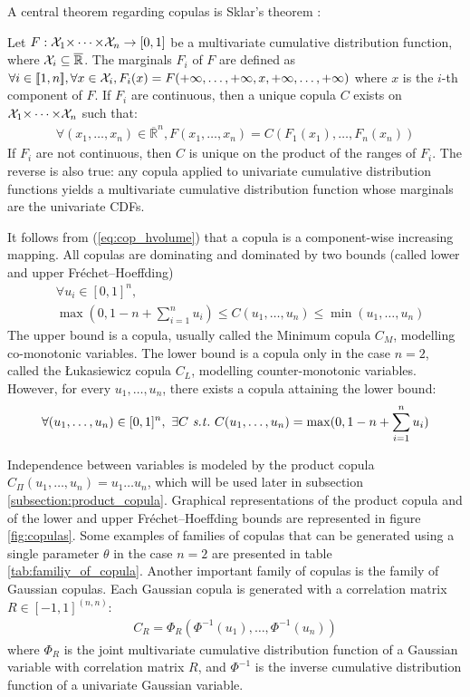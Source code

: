 A central theorem regarding copulas is Sklar's theorem \cite{sklar_fonctions_1959}:
\begin{theorem}\label{theorem:sklar}
    Let $F:{\mathcal{X}}_1{\times\dots\times}{\mathcal{X}}_n\rightarrow[0,1]$ be a multivariate cumulative distribution function, where ${\mathcal{X}}_i\subseteq\overline{\mathbb{R}}$. The marginals $F_i$ of $F$ are defined as $\forall i\in{[\![} 1,n{]\!]} , \forall x\in{\mathcal{X}}_i, F_i(x) = F( +\infty, \dots,  +\infty, x,  +\infty, \dots, +\infty)$ where $x$ is the $i$-th component of $F$. If $F_i$ are continuous, then a unique copula $C$ exists on ${\mathcal{X}}_1{\times\dots\times}{\mathcal{X}}_n$ such that:
    \begin{eqnarray}
        \forall (x_1,\dots,x_n)\in \overline{\mathbb{R}}^n, F(x_1,\dots,x_n)=C(F_1(x_1),\dots, F_n(x_n))
    \end{eqnarray}
    If $F_i$ are not continuous, then $C$ is unique on the product of the ranges of $F_i$.
    The reverse is also true: any copula applied to univariate cumulative distribution functions yields a multivariate cumulative distribution function whose marginals are the univariate CDFs.
\end{theorem}

It follows from (\ref{eq:cop_hvolume}) that a copula is a component-wise increasing mapping. All copulas are dominating and dominated by two bounds (called lower and upper Fréchet–Hoeffding)
\begin{align}
    &\forall u_i \in [0,1]^n,\nonumber\\
    &\max(0, 1-n+\sum_{i=1}^n u_i) \leqslant C(u_1,\dots,u_n) \leqslant \min(u_1, \dots, u_n)
\end{align}
The upper bound is a copula, usually called the Minimum copula $C_M$, modelling co-monotonic variables. The lower bound is a copula only in the case $n=2$, called the \L ukasiewicz copula $C_L$, modelling counter-monotonic variables. However, for every $u_1,\dots,u_n$, there exists a copula attaining the lower bound:
\begin{eqnarray*}
    \forall (u_1,\dots,u_n)\in[0,1]^n,~\exists C \text{ \st }~C(u_1,\dots,u_n) = \max(0, 1-n+\sum_{i=1}^n u_i)
\end{eqnarray*}

Independence between variables is modeled by the product copula $C_\Pi(u_1, \dots, u_n)=u_1\dots u_n$, which will be used later in subsection \ref{subsection:product_copula}. Graphical representations of the product copula and of the lower and upper Fréchet–Hoeffding bounds are represented in figure \ref{fig:copulas}. Some examples of families of copulas that can be generated using a single parameter $\theta$ in the case $n=2$ are presented in table \ref{tab:familiy_of_copula}. Another important family of copulas is the family of Gaussian copulas. Each Gaussian copula is generated with a correlation matrix $R\in[-1,1]^{(n,n)}$:
\begin{align}
    C_R=\Phi_R(\Phi^{-1}(u_1), \dots, \Phi^{-1}(u_n)) \label{eq:gaussian_copula}
\end{align} where $\Phi_R$ is the joint multivariate cumulative distribution function of a Gaussian variable with correlation matrix $R$, and $\Phi^{-1}$ is the inverse cumulative distribution function of a univariate Gaussian variable. 

